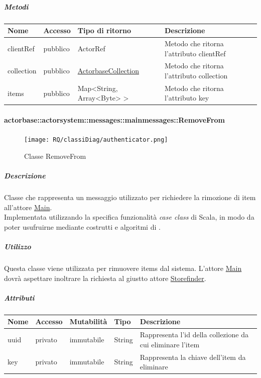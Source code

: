 \documentclass{scalatekids-article}
\begin{document}
\subparagraph{Metodi}
\begin{tabular}{| l | l | l | l |}
  \hline
  Nome & Accesso & Tipo di ritorno & Descrizione\\
  \hline
  clientRef & pubblico & ActorRef & Metodo che ritorna l'attributo clientRef\\
  \hline
  collection & pubblico & \hyperref[sec:actorbase::actorsystem::utils::ActorbaseCollection]{ActorbaseCollection} & Metodo che ritorna l'attributo collection\\
  \hline
  items & pubblico & Map<String, Array<Byte> > & Metodo che ritorna l'attributo key\\
  \hline
\end{tabular}

\paragraph{actorbase::actorsystem::messages::mainmessages::RemoveFrom}
\label{sec:actorbase::actorsystem::messages::mainmessages::RemoveFrom}

\begin{figure}[H]
  \begin{center}
    \texttt{[image: RQ/classiDiag/authenticator.png]}
    \caption{Classe RemoveFrom}
  \end{center}
\end{figure}

\subparagraph{Descrizione}
Classe che rappresenta un messaggio utilizzato per richiedere la rimozione di
item all'attore \hyperref[sec:actorbase::actorsystem::actors::main::Main]{Main}.\\Implementata utilizzando la specifica funzionalità \textit{case class} di Scala, in modo da poter usufruirne mediante costrutti e algoritmi di
.

\subparagraph{Utilizzo}
Questa classe viene utilizzata per rimuovere items dal sistema. L'attore
\hyperref[sec:actorbase::actorsystem::actors::main::Main]{Main} dovrà aspettare
inoltrare la richiesta al giustto attore \hyperref[sec:actorbase::actorsystem::actors::storefinder::Storefinder]{Storefinder}.

\subparagraph{Attributi}
\begin{tabular}{| p{2cm} | p{1.5cm} | p{2cm} | p{3cm} | p{8.5cm} |}
  \hline
  Nome & Accesso & Mutabilità & Tipo & Descrizione\\
  \hline
  uuid & privato & immutabile & String & Rappresenta l'id della collezione da cui eliminare l'item\\
  \hline
  key & privato & immutabile & String & Rappresenta la chiave dell'item da eliminare\\
  \hline
\end{tabular}
\end{document}
